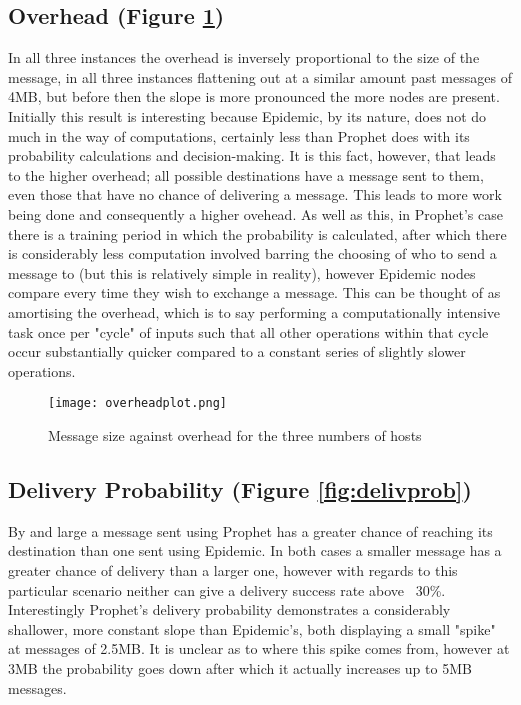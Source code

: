 \documentclass[12pt]{report}
\begin{document}
\subsection{Overhead (Figure \ref{fig:overhead})}
In all three instances the overhead is inversely proportional to the size of the message, in all three instances flattening out at a similar amount past messages of 4MB, but before then the slope is more pronounced the more nodes are present.
Initially this result is interesting because Epidemic, by its nature, does not do much in the way of computations, certainly less than Prophet does with its probability calculations and decision-making.
It is this fact, however, that leads to the higher overhead; all possible destinations have a message sent to them, even those that have no chance of delivering a message.
This leads to more work being done and consequently a higher ovehead.
As well as this, in Prophet's case there is a training period in which the probability is calculated, after which there is considerably less computation involved barring the choosing of who to send a message to (but this is relatively simple in reality), however Epidemic nodes compare every time they wish to exchange a message.
This can be thought of as amortising the overhead, which is to say performing a computationally intensive task once per "cycle" of inputs such that all other operations within that cycle occur substantially quicker compared to a constant series of slightly slower operations.

\begin{figure}[ht]
  \caption{Message size against overhead for the three numbers of hosts}
  \centering
  \texttt{[image: overheadplot.png]}
  \label{fig:overhead}
\end{figure}

\subsection{Delivery Probability (Figure \ref{fig:delivprob})}
By and large a message sent using Prophet has a greater chance of reaching its destination than one sent using Epidemic.
In both cases a smaller message has a greater chance of delivery than a larger one, however with regards to this particular scenario neither can give a delivery success rate above ~30\%.
Interestingly Prophet's delivery probability demonstrates a considerably shallower, more constant slope than Epidemic's, both displaying a small "spike" at messages of 2.5MB.
It is unclear as to where this spike comes from, however at 3MB the probability goes down after which it actually increases up to 5MB messages.
\end{document}
